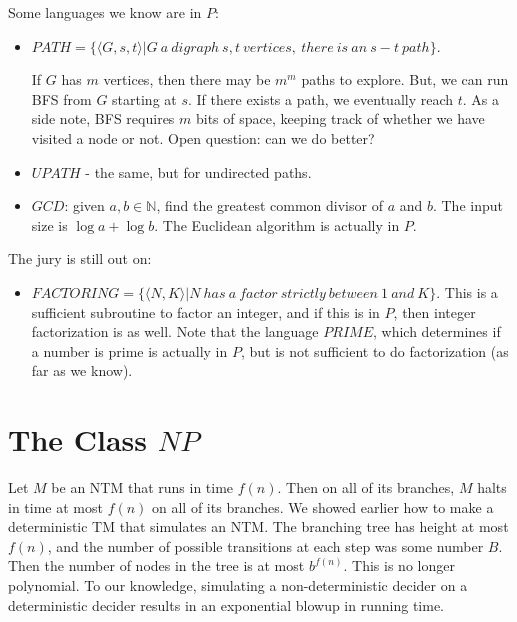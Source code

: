 \documentclass[twoside]{article}
\begin{document}
Some languages we know are in $P$:
\begin{itemize}
	\item $PATH = \{\langle G,s,t\rangle | G \ a \ digraph \ s,t\ vertices, \ there \ is \ an \ s- t\ path\}$.  
	
	If $G$ has $m$ vertices, then there may be $m^m$ paths to explore.  But, we can run BFS from $G$ starting at $s$.  If there exists a path, we eventually reach $t$.  As a side note, BFS requires $m$ bits of space, keeping track of whether we have visited a node or not.  Open question: can we do better?
	\item $UPATH$ - the same, but for undirected paths.
	\item $GCD$: given $a,b\in\mathbb{N}$, find the greatest common divisor of $a$ and $b$.  The input size is $\log{a} + \log{b}$.  The Euclidean algorithm is actually in $P$.  

\end{itemize}

The jury is still out on:
\begin{itemize}
	\item $FACTORING = \{\langle N,K \rangle | N \ has \ a \ factor \ strictly \ between \ 1  \ and \ K \}$.  This is a sufficient subroutine to factor an integer, and if this is in $P$, then integer factorization is as well.  Note that the language $PRIME$, which determines if a number is prime is actually in $P$, but is not sufficient to do factorization (as far as we know).
\end{itemize}

\section*{The Class $NP$}




Let $M$ be an NTM that runs in time $f(n)$.  Then on all of its branches, $M$ halts in time at most $f(n)$ on all of its branches.  We showed earlier how to make a deterministic TM that simulates an NTM.  The branching tree has height at most $f(n)$, and the number of possible transitions at each step was some number $B$.  Then the number of nodes in the tree is at most $b^{f(n)}$. This is no longer polynomial.  To our knowledge, simulating a non-deterministic decider on a deterministic decider results in an exponential blowup in running time.
\end{document}
